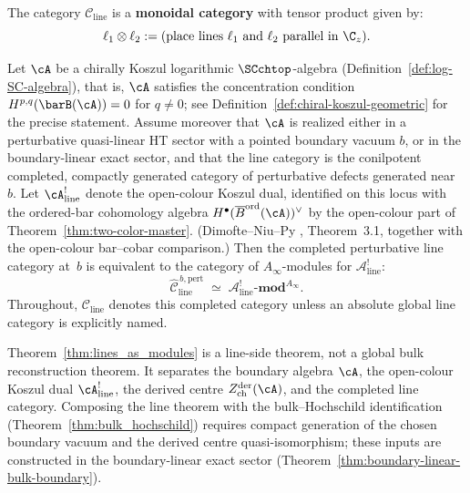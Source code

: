 The category $\mathcal{C}_{\text{line}}$ is a \textbf{monoidal category} with tensor product given by:
\begin{equation}
\ell_1 \otimes \ell_2 := \text{(place lines $\ell_1$ and $\ell_2$ parallel in $\C_z$)}.
\end{equation}

\begin{theorem}
\label{thm:lines_as_modules}
Let\/ $\cA$ be a chirally Koszul logarithmic $\SCchtop$-algebra
\textup{(}Definition~\textup{\ref{def:log-SC-algebra})}, that is,
$\cA$ satisfies the concentration condition
$H^{p,q}(\barB(\cA))=0$ for $q\neq 0$; see
Definition~\textup{\ref{def:chiral-koszul-geometric}} for the precise
statement. Assume moreover that $\cA$ is realized either in a
perturbative quasi-linear HT sector with a pointed boundary vacuum
$b$, or in the boundary-linear exact sector, and that the line category
is the conilpotent completed, compactly generated category of
perturbative defects generated near~$b$. Let\/
$\cA^!_{\mathrm{line}}$ denote the open-colour Koszul dual, identified
on this locus with the
ordered-bar cohomology algebra
$H^\bullet(\overline{B}^{\mathrm{ord}}(\cA))^\vee$ by the
open-colour part of Theorem~\ref{thm:two-color-master}.
(Dimofte--Niu--Py \cite{DNP25}, Theorem~3.1, together with the
open-colour bar--cobar comparison.) Then the completed perturbative
line category at~$b$ is equivalent to the category of
$A_\infty$-modules for $\mathcal{A}^!_{\mathrm{line}}$:
\begin{equation}
\widehat{\mathcal{C}}^{\,b,\mathrm{pert}}_{\mathrm{line}}
\;\simeq\;
\mathcal{A}^!_{\mathrm{line}}\text{-}\mathbf{mod}^{A_\infty}.
\end{equation}
Throughout, $\mathcal{C}_{\mathrm{line}}$ denotes this completed
category unless an absolute global line category is explicitly named.
\end{theorem}

\begin{remark}
\label{rem:lines-modules-scope}
Theorem~\ref{thm:lines_as_modules} is a line-side theorem, not a
global bulk reconstruction theorem. It separates the boundary algebra
$\cA$, the open-colour Koszul dual $\cA^!_{\mathrm{line}}$, the
derived centre $Z^{\mathrm{der}}_{\mathrm{ch}}(\cA)$, and the
completed line category. Composing the line theorem with the
bulk--Hochschild identification (Theorem~\ref{thm:bulk_hochschild})
requires compact generation of the chosen boundary vacuum and the
derived centre quasi-isomorphism; these inputs are constructed in the
boundary-linear exact sector
(Theorem~\ref{thm:boundary-linear-bulk-boundary}).
\end{remark}

